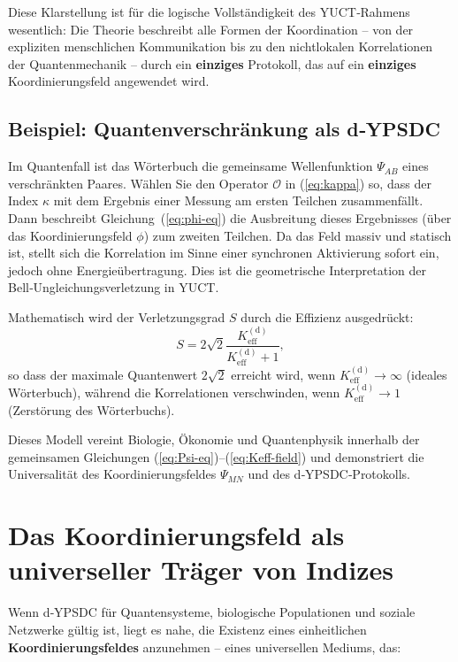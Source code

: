 \documentclass[12pt,a4paper]{article}
\begin{document}
	Diese Klarstellung ist für die logische Vollständigkeit des YUCT‑Rahmens wesentlich: Die Theorie beschreibt alle Formen der Koordination – von der expliziten menschlichen Kommunikation bis zu den nichtlokalen Korrelationen der Quantenmechanik – durch ein \textbf{einziges} Protokoll, das auf ein \textbf{einziges} Koordinierungsfeld angewendet wird.
	
	\subsection{Beispiel: Quantenverschränkung als d‑YPSDC}
	
	Im Quantenfall ist das Wörterbuch die gemeinsame Wellenfunktion \(\Psi_{AB}\) eines verschränkten Paares. Wählen Sie den Operator \(\mathcal{O}\) in (\ref{eq:kappa}) so, dass der Index \(\kappa\) mit dem Ergebnis einer Messung am ersten Teilchen zusammenfällt. Dann beschreibt Gleichung~(\ref{eq:phi-eq}) die Ausbreitung dieses Ergebnisses (über das Koordinierungsfeld \(\phi\)) zum zweiten Teilchen. Da das Feld massiv und statisch ist, stellt sich die Korrelation im Sinne einer synchronen Aktivierung sofort ein, jedoch ohne Energieübertragung. Dies ist die geometrische Interpretation der Bell‑Ungleichungsverletzung in YUCT.
	
	Mathematisch wird der Verletzungsgrad \(S\) durch die Effizienz ausgedrückt:
	\begin{equation}
		S = 2\sqrt{2} \frac{K_{\mathrm{eff}}^{\mathrm{(d)}}}{K_{\mathrm{eff}}^{\mathrm{(d)}} + 1},
	\end{equation}
	so dass der maximale Quantenwert \(2\sqrt{2}\) erreicht wird, wenn \(K_{\mathrm{eff}}^{\mathrm{(d)}} \to \infty\) (ideales Wörterbuch), während die Korrelationen verschwinden, wenn \(K_{\mathrm{eff}}^{\mathrm{(d)}} \to 1\) (Zerstörung des Wörterbuchs).
	
	Dieses Modell vereint Biologie, Ökonomie und Quantenphysik innerhalb der gemeinsamen Gleichungen (\ref{eq:Psi-eq})–(\ref{eq:Keff-field}) und demonstriert die Universalität des Koordinierungsfeldes \(\Psi_{MN}\) und des d‑YPSDC‑Protokolls.
	
	\section{Das Koordinierungsfeld als universeller Träger von Indizes}
	
	Wenn d‑YPSDC für Quantensysteme, biologische Populationen und soziale Netzwerke gültig ist, liegt es nahe, die Existenz eines einheitlichen \textbf{Koordinierungsfeldes} anzunehmen – eines universellen Mediums, das:
	
\end{document}
